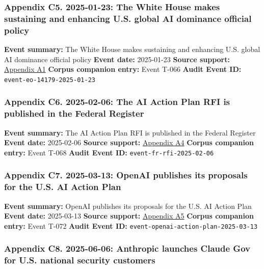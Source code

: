 \documentclass[
  american,
  11pt,
  letterpaper,
]{article}
\begin{document}
\subsubsection{Appendix C5. 2025-01-23: The White House makes sustaining
and enhancing U.S. global AI dominance official
policy}\label{ch-07-appendix-c5-2025-01-23-the-white-house-makes-sustaining-and-enhancing-u-s-global-ai-dominance-official-policy}

\textbf{Event summary:} The White House makes sustaining and enhancing
U.S. global AI dominance official policy \textbf{Event date:} 2025-01-23
\textbf{Source support:}
\hyperref[ch-07-appendix-a1-removing-barriers-to-american-leadership-in-artificial-intelligence]{Appendix
A1} \textbf{Corpus companion entry:} Event T-066 \textbf{Audit Event
ID:} \texttt{event-eo-14179-2025-01-23}

\subsubsection{Appendix C6. 2025-02-06: The AI Action Plan RFI is
published in the Federal
Register}\label{ch-07-appendix-c6-2025-02-06-the-ai-action-plan-rfi-is-published-in-the-federal-register}

\textbf{Event summary:} The AI Action Plan RFI is published in the
Federal Register \textbf{Event date:} 2025-02-06 \textbf{Source
support:}
\hyperref[ch-07-appendix-a4-request-for-information-on-the-development-of-an-artificial-intelligence-ai-action-plan]{Appendix
A4} \textbf{Corpus companion entry:} Event T-068 \textbf{Audit Event
ID:} \texttt{event-fr-rfi-2025-02-06}

\subsubsection{Appendix C7. 2025-03-13: OpenAI publishes its proposals
for the U.S. AI Action
Plan}\label{ch-07-appendix-c7-2025-03-13-openai-publishes-its-proposals-for-the-u-s-ai-action-plan}

\textbf{Event summary:} OpenAI publishes its proposals for the U.S. AI
Action Plan \textbf{Event date:} 2025-03-13 \textbf{Source support:}
\hyperref[ch-07-appendix-a5-openais-proposals-for-the-us-ai-action-plan]{Appendix
A5} \textbf{Corpus companion entry:} Event T-072 \textbf{Audit Event
ID:} \texttt{event-openai-action-plan-2025-03-13}

\subsubsection{Appendix C8. 2025-06-06: Anthropic launches Claude Gov
for U.S. national security
customers}\label{ch-07-appendix-c8-2025-06-06-anthropic-launches-claude-gov-for-u-s-national-security-customers}
\end{document}
